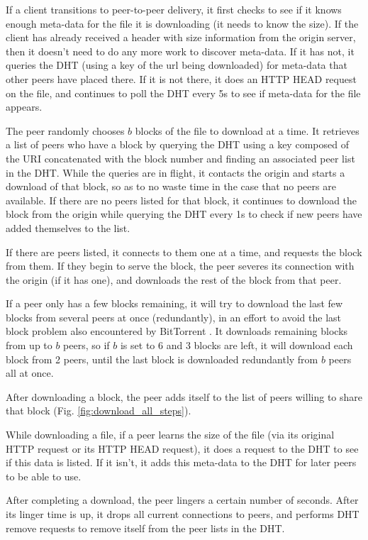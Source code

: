 If a client transitions to peer-to-peer delivery, it first checks to see if it knows enough meta-data for the file it is downloading (it needs to know the size).
If the client has already received a header with size information from the origin server, then it doesn't need to do any more work to discover meta-data.  If it has not, it
queries the DHT (using a key of the url being downloaded) for meta-data that other peers have placed there.  If it is not there, it does an HTTP HEAD request on the file, and continues
to poll the DHT every 5s to see if meta-data for the file appears.  

The peer randomly chooses $b$ blocks of the file to download at a time.  It retrieves a list of peers who have a block by querying the DHT using a key composed of
the URI concatenated with the block number and finding an associated peer list in the DHT.  While the queries are in flight, it contacts the origin and starts a download of that block, so as to no waste time in the case that no peers are available.
If there are no peers listed for that block, it continues to download the block from the origin while querying the DHT every 1s to check if new peers have added themselves to the list.

If there are peers listed, it connects to them one at a time, and requests the block from them.  If they begin to serve the block, the peer severes its connection with the origin (if it has one),
and downloads the rest of the block from that peer.

If a peer only has a few blocks remaining, it will try to download the last few blocks from several peers at once (redundantly), in an effort to avoid the last block problem also
encountered by BitTorrent \cite{bram}.  It downloads remaining blocks from up to $b$ peers, so if $b$ is set to 6 and 3 blocks are left, it will download each block from 2 peers, until
the last block is downloaded redundantly from $b$ peers all at once.

After downloading a block, the peer adds itself to the list of peers willing to share that block (Fig. \ref{fig:download_all_steps}). 

While downloading a file, if a peer learns the size of the file (via its original HTTP request or its HTTP HEAD request), it does a request to the DHT to see if this
data is listed.  If it isn't, it adds this meta-data to the DHT for later peers to be able to use.

After completing a download, the peer lingers a certain number of seconds.  After its linger time is up, it drops all current connections to peers, and performs DHT remove requests to
remove itself from the peer lists in the DHT.

